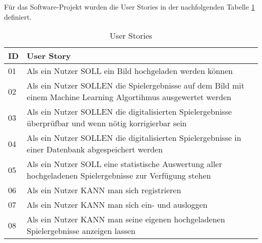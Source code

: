 Für das Software-Projekt wurden die User Stories in der nachfolgenden Tabelle  \ref{table:user_stories} definiert.
\pagebreak
\begin{table}[]
    \begin{tabular}{m{2.5cm}|m{12cm}}
    \textbf{ID} & \textbf{User Story}                                                                                              \\ \hline
    01          & Als ein Nutzer SOLL ein Bild hochgeladen werden können                                                           \\
    02          & Als ein Nutzer SOLLEN die Spielergebnisse auf dem Bild mit einem Machine Learning Algortihmus ausgewertet werden \\
    03          & Als ein Nutzer SOLLEN die digitalisierten Spielergebnisse überprüfbar und wenn nötig korrigierbar sein           \\
    04          & Als ein Nutzer SOLLEN die digitalisierten Spielergebnisse in einer Datenbank abgespeichert werden                \\
    05          & Als ein Nutzer SOLL eine statistische Auswertung aller hochgeladenen Spielergebnisse zur Verfügung stehen        \\
    06          & Als ein Nutzer KANN man sich registrieren                                                                        \\
    07          & Als ein Nutzer KANN man sich ein- und ausloggen                                                                  \\
    08          & Als ein Nutzer KANN man seine eigenen hochgeladenen Spielergebnisse anzeigen lassen                             
    \end{tabular}
    \caption{User Stories}
    \label{table:user_stories}
\end{table}
